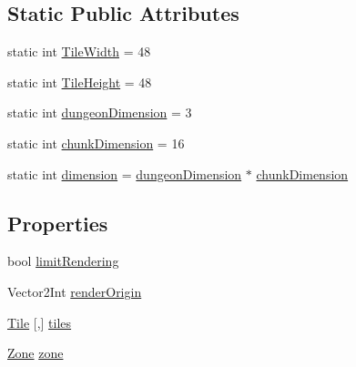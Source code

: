 \subsection*{Static Public Attributes}
\begin{DoxyCompactItemize}
\item 
static int \mbox{\hyperlink{class_dungeon_manager_a4090d1011387dda52819df07e9e76d6a}{Tile\+Width}} = 48
\item 
static int \mbox{\hyperlink{class_dungeon_manager_aa96f4d9660ed44bb2c21b8b11ec2dbc3}{Tile\+Height}} = 48
\item 
static int \mbox{\hyperlink{class_dungeon_manager_ac2d375dcf35a5a62c98fce7bc6dd44e0}{dungeon\+Dimension}} = 3
\item 
static int \mbox{\hyperlink{class_dungeon_manager_a36a67a913c6a4b58b2f32094c23df9e2}{chunk\+Dimension}} = 16
\item 
static int \mbox{\hyperlink{class_dungeon_manager_ae88e176f6ea28c2dfb59af8db9967e88}{dimension}} = \mbox{\hyperlink{class_dungeon_manager_ac2d375dcf35a5a62c98fce7bc6dd44e0}{dungeon\+Dimension}} $\ast$ \mbox{\hyperlink{class_dungeon_manager_a36a67a913c6a4b58b2f32094c23df9e2}{chunk\+Dimension}}
\end{DoxyCompactItemize}
\subsection*{Properties}
\begin{DoxyCompactItemize}
\item 
bool \mbox{\hyperlink{class_dungeon_manager_a6f04a65ae61dd9b11d58489272b5fa70}{limit\+Rendering}}
\item 
Vector2\+Int \mbox{\hyperlink{class_dungeon_manager_af1c37437d9ec1f72c4dc6a0300d226df}{render\+Origin}}
\item 
\mbox{\hyperlink{class_tile}{Tile}} \mbox{[},\mbox{]} \mbox{\hyperlink{class_dungeon_manager_a35b1117b28fd54ff805320dc50fd206d}{tiles}}
\item 
\mbox{\hyperlink{class_dungeon_manager_a6558d4a01889674bf25c798f1b90a431}{Zone}} \mbox{\hyperlink{class_dungeon_manager_a4a1b9933b14faea37aeb07bd6f290774}{zone}}
\end{DoxyCompactItemize}


